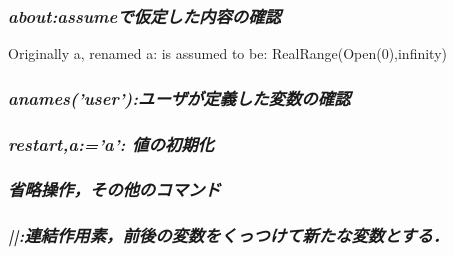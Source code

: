 \documentclass{article}
\begin{document}
\subsubsection{\textit{about:assumeで仮定した内容の確認}}
\begin{maplegroup}
\begin{mapleinput}
\end{mapleinput}
\mapleresult
Originally a, renamed a:
is assumed to be: RealRange(Open(0),infinity)\end{maplegroup}
\subsubsection{\textit{anames('user'):ユーザが定義した変数の確認}}
\begin{maplegroup}
\begin{mapleinput}
\end{mapleinput}
\mapleresult
\begin{maplelatex}
\end{maplelatex}
\end{maplegroup}
\subsubsection{\textit{restart,a:='a': 値の初期化}}
\subsubsection{\textbf{\textit{省略操作，その他のコマンド}}}
\subsubsection{\textit{||:連結作用素，前後の変数をくっつけて新たな変数とする．}}
\begin{maplegroup}
\begin{mapleinput}
\end{mapleinput}
\mapleresult
\begin{maplelatex}
\end{maplelatex}
\mapleresult
\begin{maplelatex}
\end{maplelatex}
\end{maplegroup}
\begin{maplegroup}
\begin{mapleinput}
\end{mapleinput}
\end{maplegroup}
\end{document}
